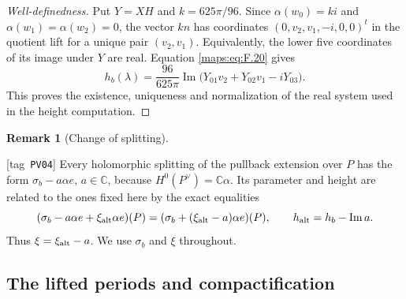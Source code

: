 \documentclass[11pt,a4paper]{article}
\numberwithin{equation}{section}
\theoremstyle{definition}
\newtheorem{remark}[remark]{Remark}
\newcommand{\StatementRecord}[4]{{\upshape\footnotesize[tag~\texttt{#3}]}\enspace\ignorespaces}
\begin{document}
\begin{proof}[Well-definedness]
Put $Y=XH$ and $k=625\pi/96$. Since
$\alpha(w_0)=ki$ and $\alpha(w_1)=\alpha(w_2)=0$,
the vector $kn$ has coordinates
$(0,v_2,v_1,-i,0,0)^t$ in the quotient lift for a unique
pair $(v_2,v_1)$. Equivalently, the lower five coordinates
of its image under $Y$ are real. Equation
\eqref{maps:eq:F.20} gives
\[
 h_b(\lambda)=\frac{96}{625\pi}
 \operatorname{Im}\bigl(Y_{01}v_2+Y_{02}v_1-iY_{03}\bigr).
\]
This proves the existence, uniqueness and normalization of the
real system used in the height computation.
\end{proof}

\begin{remark}[Change of splitting]
\hypertarget{tag-PV04}{}\label{rem:V:splitting-change}
\StatementRecord{rem:V:splitting-change}{proved}{PV04}{}
Every holomorphic splitting of the pullback extension over $P$
has the form $\sigma_b-a\alpha e$, $a\in\mathbb C$, because
$H^0(P^\vee)=\mathbb C\alpha$. Its parameter and height are
related to the ones fixed here by the exact equalities
\[
 (\sigma_b-a\alpha e+\xi_{\rm alt}\alpha e)(P)
  =(\sigma_b+(\xi_{\rm alt}-a)\alpha e)(P),
 \qquad h_{\rm alt}=h_b-\operatorname{Im}a.
\]
Thus $\xi=\xi_{\rm alt}-a$. We use $\sigma_b$ and $\xi$
throughout.
\end{remark}

\subsection{The lifted periods and compactification}
\end{document}
